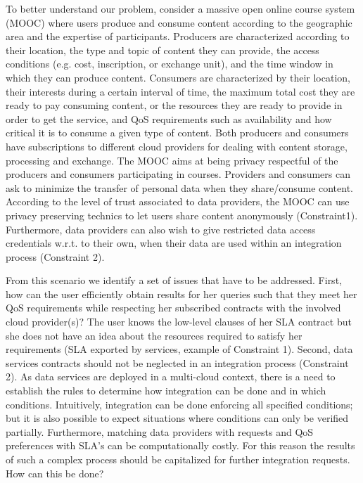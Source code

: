 To better understand our problem, consider a massive open online course system (MOOC) where users produce and consume content according to the geographic area and the expertise of participants. 
Producers are characterized according to their location, the type and topic of  content  they can provide, the access conditions (e.g. cost, inscription, or exchange unit), and the time window in which they can produce content. 
Consumers are characterized by their location, their interests  during a certain interval of time, the maximum total cost they are ready to pay consuming content, or the resources they are ready to provide in order to get the service, and QoS requirements such as availability and how critical it is to consume a given type of content. Both producers and consumers have subscriptions to different cloud providers for dealing with content storage, processing and exchange.
The MOOC  aims at being privacy respectful of the producers and consumers participating in courses.
 Providers  and consumers can ask to minimize the transfer of personal data  when they share/consume content.  According to the level of trust associated to data providers, the MOOC can use privacy preserving technics to let users share content anonymously  (Constraint1). Furthermore,  data providers can  also wish to give restricted data access credentials w.r.t. to their own, when their data are used  within  an integration process (Constraint 2).  
 

  From this scenario we identify a set of issues that have to be addressed. First, how can the user efficiently obtain  results for her queries such that they meet her QoS requirements while respecting her subscribed contracts with the involved cloud provider(s)?  The user knows the low-level clauses of her SLA contract but she does not have an idea about the resources required to satisfy her requirements (SLA exported by services, example of Constraint 1).  Second, data services contracts should not be neglected in an integration process (Constraint 2).   As data services are deployed in a multi-cloud context, there is a need to establish the rules to determine how integration can be done and in which conditions. Intuitively, integration can be  done enforcing all specified conditions; but it is also possible to  expect situations where conditions can only be verified partially. Furthermore,  matching data providers with requests and QoS preferences with SLA's can be computationally costly. For this reason  the results of  such a  complex process  should be capitalized for further integration requests. How can this be done? 
  

